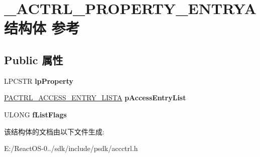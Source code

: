 \hypertarget{struct___a_c_t_r_l___p_r_o_p_e_r_t_y___e_n_t_r_y_a}{}\section{\+\_\+\+A\+C\+T\+R\+L\+\_\+\+P\+R\+O\+P\+E\+R\+T\+Y\+\_\+\+E\+N\+T\+R\+Y\+A结构体 参考}
\label{struct___a_c_t_r_l___p_r_o_p_e_r_t_y___e_n_t_r_y_a}
\subsection*{Public 属性}
\begin{DoxyCompactItemize}
\item 
\mbox{\label{struct___a_c_t_r_l___p_r_o_p_e_r_t_y___e_n_t_r_y_a_a65baf6983a7b2f5bc5ca7b54e43fef9f}} 
L\+P\+C\+S\+TR {\bfseries lp\+Property}
\item 
\mbox{\label{struct___a_c_t_r_l___p_r_o_p_e_r_t_y___e_n_t_r_y_a_a4864e1491aa34d715f4896eb70d0629f}} 
\hyperlink{struct___a_c_t_r_l___a_c_c_e_s_s___e_n_t_r_y___l_i_s_t_a}{P\+A\+C\+T\+R\+L\+\_\+\+A\+C\+C\+E\+S\+S\+\_\+\+E\+N\+T\+R\+Y\+\_\+\+L\+I\+S\+TA} {\bfseries p\+Access\+Entry\+List}
\item 
\mbox{\label{struct___a_c_t_r_l___p_r_o_p_e_r_t_y___e_n_t_r_y_a_a3babdf52fb1c607a6f295f6053fdd298}} 
U\+L\+O\+NG {\bfseries f\+List\+Flags}
\end{DoxyCompactItemize}


该结构体的文档由以下文件生成\+:\begin{DoxyCompactItemize}
\item 
E\+:/\+React\+O\+S-\/0../sdk/include/psdk/accctrl.\+h\end{DoxyCompactItemize}
